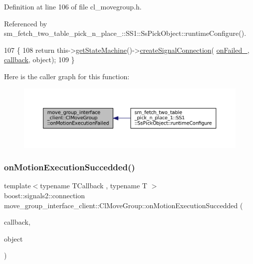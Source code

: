 Definition at line 106 of file cl\+\_\+movegroup.\+h.



Referenced by sm\+\_\+fetch\+\_\+two\+\_\+table\+\_\+pick\+\_\+n\+\_\+place\+\_\+::\+S\+S1\+::\+Ss\+Pick\+Object\+::runtime\+Configure().


\begin{DoxyCode}
107   \{
108     \textcolor{keywordflow}{return} this->\hyperlink{classsmacc_1_1ISmaccClient_aec51d4712404cb9882b86e4c854bb93a}{getStateMachine}()->\hyperlink{classsmacc_1_1ISmaccStateMachine_adf0f42ade0c65cc471960fe2a7c42da2}{createSignalConnection}(
      \hyperlink{classmove__group__interface__client_1_1ClMoveGroup_a793ac2c50a1d897afe14a8780940e8ce}{onFailed\_}, \hyperlink{servers_2opencv__perception__node_2opencv__perception__node_8cpp_a050e697bd654facce10ea3f6549669b3}{callback}, \textcolor{keywordtype}{object});
109   \}
\end{DoxyCode}
Here is the caller graph for this function\+:
\nopagebreak
\begin{figure}[H]
\begin{center}
\leavevmode
\includegraphics[width=350pt]{classmove__group__interface__client_1_1ClMoveGroup_a0729ef7e1ea6500f449ccdc2c3b0e3ec_icgraph}
\end{center}
\end{figure}
\mbox{\label{classmove__group__interface__client_1_1ClMoveGroup_a04f3cafe060033b66f3fac27f744a043}} 
\subsubsection{\texorpdfstring{on\+Motion\+Execution\+Succedded()}{onMotionExecutionSuccedded()}}
{\footnotesize\ttfamily template$<$typename T\+Callback , typename T $>$ \\
boost\+::signals2\+::connection move\+\_\+group\+\_\+interface\+\_\+client\+::\+Cl\+Move\+Group\+::on\+Motion\+Execution\+Succedded (\begin{DoxyParamCaption}\item[{T\+Callback}]{callback,  }\item[{T $\ast$}]{object }\end{DoxyParamCaption})\hspace{0.3cm}{\ttfamily [inline]}}



